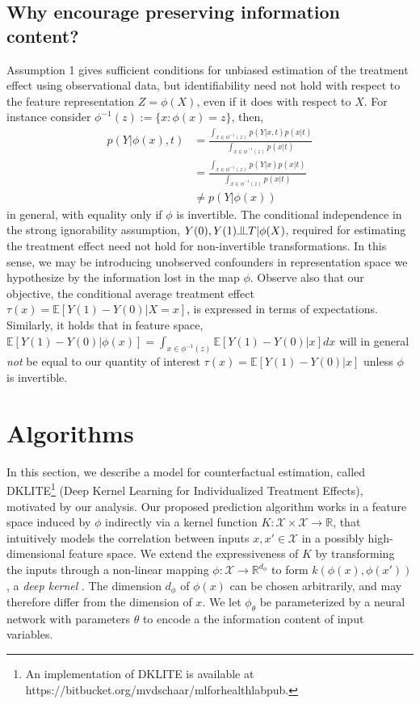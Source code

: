 \documentclass[twoside]{article}
\newcommand{\indep}{\raisebox{0.08em}{\rotatebox[origin=c]{90}{$\models$}}}
\begin{document}
\subsection{Why encourage preserving information content?}
Assumption 1 gives sufficient conditions for unbiased estimation of the treatment effect using observational data, but identifiability need not hold with respect to the feature representation $Z=\phi(X)$, even if it does with respect to $X$. For instance consider $\phi^{-1}(z):=\{x: \phi(x) = z\}$, then,
\begin{align}
    p(Y|\phi(x),t) &= \frac{\int_{x \in \phi^{-1}(z)}p(Y|x,t)p(x|t)}{\int_{x \in \phi^{-1}(z)}p(x|t)} \nonumber\\
    &=\frac{\int_{x \in \phi^{-1}(z)}p(Y|x)p(x|t)}{\int_{x \in \phi^{-1}(z)}p(x|t)} \nonumber\\
    &\neq p(Y|\phi(x))
\end{align}
in general, with equality only if $\phi$ is invertible. The conditional independence in the strong ignorability assumption, $Y(0),Y(1)\indep T | \phi(X)$, required for estimating the treatment effect need not hold for non-invertible transformations. In this sense, we may be introducing unobserved confounders in representation space we hypothesize by the information lost in the map $\phi$. Observe also that our objective, the conditional average treatment effect $\tau(x) = \mathbb{E}[Y (1) - Y (0) | X = x]$, is expressed in terms of expectations. Similarly, it holds that in feature space, $\mathbb{E}[Y (1) - Y (0)|\phi(x)] = \int_{x \in \phi^{-1}(z)} \mathbb{E}[Y (1) - Y (0)|x] dx$ will in general \textit{not} be equal to our quantity of interest $\tau(x) = \mathbb{E}[Y (1) - Y (0)|x]$ unless $\phi$ is invertible. 

\section{Algorithms}
In this section, we describe a model for counterfactual estimation, called DKLITE\footnote{An implementation of DKLITE is available at https://bitbucket.org/mvdschaar/mlforhealthlabpub.} (Deep Kernel Learning for Individualized Treatment Effects), motivated by our analysis. Our proposed prediction algorithm works in a feature space induced by $\phi$ indirectly via a kernel function $K:\mathcal X \times \mathcal X \rightarrow \mathbb R$, that intuitively models the correlation between inputs $x, x'\in\mathcal X$ in a possibly high-dimensional feature space. We extend the expressiveness of $K$ by transforming the inputs through a non-linear mapping $\phi : \mathcal X \rightarrow \mathbb{R}^{d_{\phi}}$ to form $k(\phi(x), \phi(x'))$, a \textit{deep kernel} \cite{wilson2016deep}. The dimension $d_{\phi}$ of $\phi(x)$ can be chosen arbitrarily, and may therefore differ from the dimension of $x$. We let $\phi_{\theta}$ be parameterized by a neural network with parameters $\theta$ to encode a the information content of input variables. 
\end{document}

